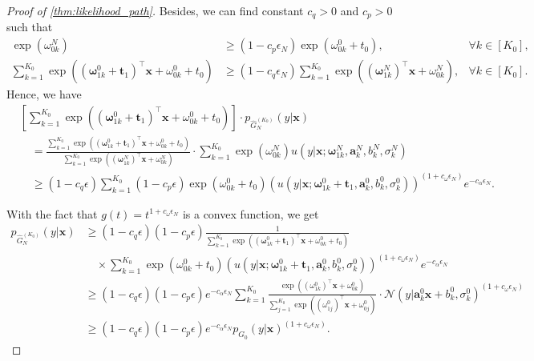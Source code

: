 \documentclass[twoside]{article}
\theoremstyle{plain}
\theoremstyle{definition}
\theoremstyle{plain}
\def\vomega{{\bm{\omega}}}
\def\va{{\bm{a}}}
\def\vt{{\bm{t}}}
\def\vx{{\bm{x}}}
\begin{document}
\begin{proof}[Proof of \cref{thm:likelihood_path}]
    Besides, we can find constant $c_q > 0$ and $c_p > 0$ such that
    \begin{align*}
        \exp(\omega_{0k}^N) &\geq (1 - c_p \epsilon_N) \exp{(\omega_{0k}^0 + t_0)}, &\forall k \in [K_0],\\
        \sum_{k = 1}^{K_0} \exp((\vomega_{1k}^0 + \vt_1)^{\top} \vx + \omega_{0k}^0 + t_0) &\geq (1 - c_q \epsilon_N) \sum_{k = 1}^{K_0} \exp((\vomega_{1k}^N)^{\top} \vx + \omega_{0k}^N), &\forall k \in [K_0].
    \end{align*}
    Hence, we have 
    \begin{align*}
        &\left[\sum_{k = 1}^{K_0} \exp((\vomega_{1k}^0 + \vt_1)^{\top} \vx + \omega_{0k}^0 + t_0) \right] \cdot p_{\widehat{G}^{(K_0)}_N} (y | \vx) \\
        &\quad = \frac{\sum_{k = 1}^{K_0} \exp((\vomega_{1k}^0 + \vt_1)^{\top} \vx + \omega_{0k}^0 + t_0)}{\sum_{k = 1}^{K_0} \exp((\vomega_{1k}^N)^{\top} \vx + \omega_{0k}^N)} \cdot \sum_{k = 1}^{K_0} \exp{(\omega_{0k}^N)} u (y | \vx; \vomega_{1k}^N, \va_k^N, b_k^N, \sigma_k^N) \\
        &\quad \geq (1 - c_q \epsilon) \sum_{k = 1}^{K_0} (1 - c_p \epsilon) \exp{(\omega_{0k}^0 + t_0)} (u (y | \vx; \vomega_{1k}^0 + \vt_1, \va_k^0, b_k^0, \sigma_k^0))^{(1 + c_{\omega} \epsilon_N)} e^{-c_{\alpha} \epsilon_N}.
    \end{align*}

    With the fact that $g(t) = t^{1 + c_{\omega} \epsilon_N}$ is a convex function, we get
    \begin{align*}
        p_{\widehat{G}^{(K_0)}_N} (y | \vx) &\geq (1 - c_q \epsilon) (1 - c_p \epsilon) \frac{1}{\sum_{k = 1}^{K_0} \exp((\vomega_{1k}^0 + \vt_1)^{\top} \vx + \omega_{0k}^0 + t_0)} \\
        &\quad \times \sum_{k = 1}^{K_0} \exp{(\omega_{0k}^0 + t_0)} (u (y | \vx; \vomega_{1k}^0 + \vt_1, \va_k^0, b_k^0, \sigma_k^0))^{(1 + c_{\omega} \epsilon_N)} e^{-c_{\alpha} \epsilon_N} \\
        &\geq (1 - c_q \epsilon) (1 - c_p \epsilon) e^{-c_{\alpha} \epsilon_N} \sum_{k = 1}^{K_0} \frac{\exp{((\omega_{1k}^0)^{\top} \vx + \omega_{0k}^0)}}{\sum_{j = 1}^{K_0} \exp{((\omega_{1j}^0)^{\top} \vx + \omega_{0j}^0)}} \cdot \mathcal{N} (y | \va_k^0 \vx + b_k^0, \sigma_k^0)^{(1 + c_{\omega} \epsilon_N)} \\
        &\geq (1 - c_q \epsilon) (1 - c_p \epsilon) e^{-c_{\alpha} \epsilon_N} p_{G_0} (y | \vx)^{(1 + c_{\omega} \epsilon_N)}.
    \end{align*}


\end{proof}
\end{document}
